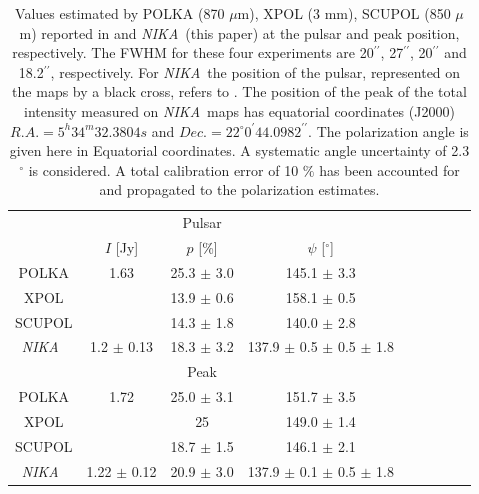 \documentclass[twocolumn,traditabstract]{aa}
\def\NIKA{\textit{NIKA}}
\begin{document}
\begin{table}[h!]
  \centering
      \begin{tabular}{ccccccccc}
      \hline
      \hline
      & &  \small Pulsar & & \\
       & \small $I$ [Jy]& \small $p$ [\%] & \small $\psi$ [$^\circ$] & \\ 
       \hline
      \small POLKA   & \small 1.63 & \small 25.3 $\pm$ \small 3.0 & \small 145.1 $\pm$ \small 3.3 & \\
      \small XPOL     & & \small 13.9 $\pm$ \small 0.6 & \small 158.1 $\pm$ \small 0.5 &  \\
      \small SCUPOL &  & \small 14.3 $\pm$ \small 1.8 & \small 140.0 $\pm$ \small 2.8& \\
      \small \NIKA\ & \small 1.2 $\pm$ \small 0.13 & \small 18.3 $\pm$ \small 3.2 & \small 137.9 $\pm$ \small 0.5 $\pm$ \small 0.5 $\pm$ \small 1.8\\
      \hline
      \hline
       & &  \small Peak & & \\
       \hline
      \small POLKA & \small 1.72 & \small 25.0 $\pm$ \small 3.1 & \small 151.7 $\pm$ \small 3.5 &  \\
      \small XPOL  & &  \small 25 & \small 149.0 $\pm $ \small 1.4 &  \\
      \small SCUPOL &  & \small 18.7 $\pm$ 1.5 & \small 146.1 $\pm$ \small 2.1&\\
  \small \NIKA\ &  \small 1.22 $\pm$ \small 0.12 & \small 20.9 $\pm$ \small 3.0 & \small 137.9 $\pm$ \small 0.1 $\pm$ \small 0.5 $\pm$ \small 1.8\\
     \hline            
    \hline   
    \end{tabular}
   \caption{ Values estimated by POLKA (870 $\mu$m), XPOL (3 mm), SCUPOL (850 $\mu$m) reported in \cite{2014PASP..126.1027W} and \NIKA\ (this paper) at the pulsar and peak position, respectively. The FWHM for these four experiments are 20$^{\prime\prime}$, 27$^{\prime\prime}$, 20$^{\prime\prime}$ and 18.2$^{\prime\prime}$, respectively. For \NIKA\ the position of the pulsar, represented on the maps by a black cross, refers to \cite{Lobanov}. The position of the peak of the total intensity measured on \NIKA\ maps has equatorial coordinates (J2000) $R.A. =5^h34^m32.3804s$ and $Dec. = 22^{\circ}0^{\prime}44.0982^{\prime\prime}$. The polarization angle is given here in Equatorial coordinates. A systematic angle uncertainty of 2.3$^{\circ}$ is considered. A total calibration error of 10 $\%$ has been accounted for and propagated to the polarization estimates.}
\label{tab:peak_pulsar_others}
 \end{table}
\end{document}
